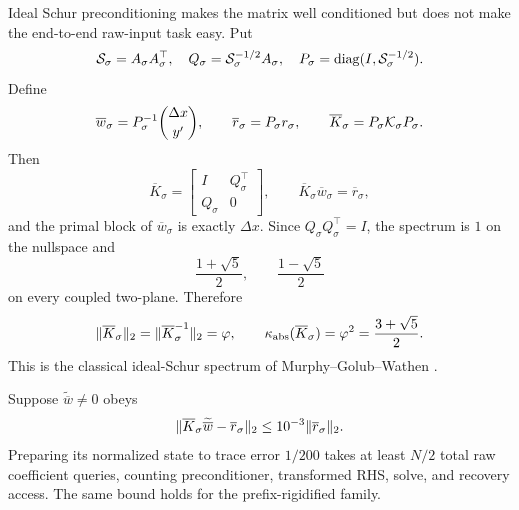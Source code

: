 Ideal Schur preconditioning makes the matrix well conditioned but does not
make the end-to-end raw-input task easy.  Put
\[
 {\cal S}_\sigma=A_\sigma A_\sigma^\top,\quad
 Q_\sigma={\cal S}_\sigma^{-1/2}A_\sigma,\quad
 P_\sigma=\operatorname{diag}(I,{\cal S}_\sigma^{-1/2}).
\]
Define
\[
 \overline w_\sigma=P_\sigma^{-1}\binom{\Delta x}{y'},\qquad
 \overline r_\sigma=P_\sigma r_\sigma,\qquad
 \overline K_\sigma=P_\sigma{\cal K}_\sigma P_\sigma.
\]
Then
\begin{equation}
 \overline K_\sigma=
 \begin{bmatrix}I&Q_\sigma^\top\\Q_\sigma&0\end{bmatrix},
 \qquad
 \overline K_\sigma\overline w_\sigma=\overline r_\sigma,
\end{equation}
and the primal block of \(\overline w_\sigma\) is exactly \(\Delta x\).
Since \(Q_\sigma Q_\sigma^\top=I\), the spectrum is \(1\) on the nullspace and
\begin{equation}
 \frac{1+\sqrt5}{2},\qquad \frac{1-\sqrt5}{2}
\end{equation}
on every coupled two-plane.  Therefore
\begin{equation}
 \lVert\overline K_\sigma\rVert_2
 =\lVert\overline K_\sigma^{-1}\rVert_2=\varphi,\qquad
 \kappa_{\rm abs}(\overline K_\sigma)=\varphi^2
 =\frac{3+\sqrt5}{2}.
\label{eq:lp-tag-9-69}
\end{equation}
This is the classical ideal-Schur spectrum of Murphy--Golub--Wathen
\cite{murphy2000-a-note-on-preconditioning-for}.

\begin{theorem}
\label{thm:lp-preconditioned-kkt}
Suppose \(\widetilde{\overline w}\ne0\) obeys
\begin{equation}
 \lVert\overline K_\sigma\widetilde{\overline w}
       -\overline r_\sigma\rVert_2
 \leq10^{-3}\lVert\overline r_\sigma\rVert_2.
\label{eq:lp-tag-9-70}
\end{equation}
Preparing its normalized state to trace error \(1/200\) takes at least
\(N/2\) total raw coefficient queries, counting preconditioner, transformed
RHS, solve, and recovery access.  The same bound holds for the
prefix-rigidified family.
\end{theorem}

